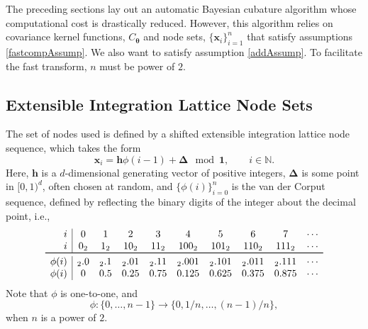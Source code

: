 \documentclass[twocolumn]{svjour3}          %
\newcommand{\bm}[1]{\boldsymbol{#1}}
\newcommand{\naturals}{\mathbb{N}}
\newcommand{\vDelta}{{\boldsymbol{\Delta}}}
\newcommand{\vtheta}{{\bm{\theta}}}
\newcommand{\vh}{\bm{h}}
\newcommand{\vx}{\bm{x}}
\newcommand{\vone}{\bm{1}}
\begin{document}
The preceding sections lay out an automatic Bayesian cubature algorithm whose computational cost is drastically reduced.  However, this algorithm relies on covariance kernel functions, $C_\vtheta$ and node sets, $\{\vx_i\}_{i=1}^n$ that satisfy assumptions \eqref{fastcompAssump}.  We  also want to satisfy assumption \eqref{addAssump}.  
To facilitate the fast transform, $n$ must be power of $2$.  

\subsection{Extensible Integration Lattice Node Sets}

The set of nodes used is defined by a shifted extensible integration lattice node sequence, which takes the form
\begin{equation} \label{eqn:lattice_def}
\vx_{i} = \vh \phi(i-1) + \vDelta \mod \vone, \qquad i \in \naturals.
\end{equation} 
Here, $\vh$ is a $d$-dimensional generating vector of positive integers, $\vDelta$ is some point in $[0,1)^d$, often chosen at random, and $\{\phi(i)\}_{i=0}^n$ is the van der Corput sequence, defined by reflecting the binary digits of the integer about the decimal point, i.e., 
\begin{align} \label{vdCDef}
\begin{array}{r|ccccccccccccc}
i & 0 & 1 & 2 & 3 & 4 &  5 & 6 & 7 & \cdots \\
i & 0_2 & 1_2 & 10_2 & 11_2 & 100_2 & 101_2 & 110_2 & 111_2  & \cdots\\
\toprule
\phi(i) & {}_2.0 &  {}_2.1 & {}_2.01 &  {}_2.11  & {}_2.001 &  {}_2.101 & {}_2.011 &  {}_2.111 & \cdots\\
\phi(i) & 0 &  0.5 &  0.25 & 0.75 &  0.125 & 0.625  &  0.375 & 0.875 & \cdots
\end{array}
\end{align}
Note that $\phi$ is one-to-one, and 
\begin{equation} \label{phiprop}
\phi:\{0, \ldots, n-1 \} \to \{0, 1/n, \ldots, (n-1)/n\},
\end{equation}
when $n$ is a power of $2$.
\end{document}
